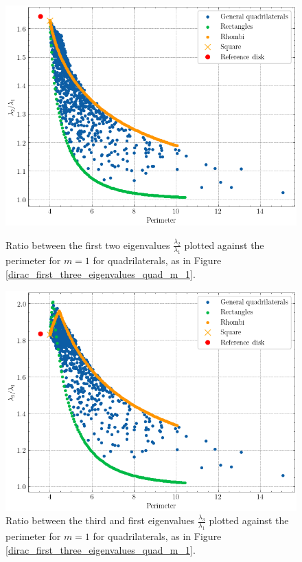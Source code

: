 \begin{figure}[!htb]
    \begin{minipage}[c]{0.45\textwidth}
        \centering
        \includegraphics[width=\textwidth]{Images/Dirac/quad/benguria_quad.png}
        \captionsetup{width=0.8\linewidth} %
        \caption{Ratio between the first two eigenvalues \(\frac{\lambda_2}{\lambda_1}\) plotted against the perimeter for \(m=1\) for quadrilaterals, as in Figure \ref{dirac_first_three_eigenvalues_quad_m_1}.}
        \label{dirac_benguria_quad}
    \end{minipage}
    \hfill
    \begin{minipage}[c]{0.45\textwidth}
        \centering
        \includegraphics[width=\textwidth]{Images/Dirac/quad/generalized_benguria_quad.png}
        \captionsetup{width=0.8\linewidth} %
        \caption{Ratio between the third and first eigenvalues \(\frac{\lambda_3}{\lambda_1}\) plotted against the perimeter for \(m=1\) for quadrilaterals, as in Figure \ref{dirac_first_three_eigenvalues_quad_m_1}.}
        \label{dirac_generalized_benguria_quad}
    \end{minipage}
    \vspace{0.5cm}
\end{figure}

